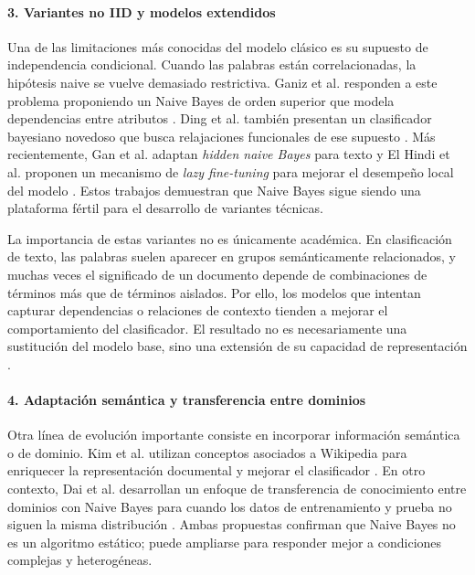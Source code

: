 \paragraph{3. Variantes no IID y modelos extendidos}

Una de las limitaciones más conocidas del modelo clásico es su supuesto de independencia condicional. Cuando las palabras están correlacionadas, la hipótesis naive se vuelve demasiado restrictiva. Ganiz et al. responden a este problema proponiendo un Naive Bayes de orden superior que modela dependencias entre atributos \cite{Ganiz20111022}. Ding et al. también presentan un clasificador bayesiano novedoso que busca relajaciones funcionales de ese supuesto \cite{4554061}. Más recientemente, Gan et al. adaptan \textit{hidden naive Bayes} para texto y El Hindi et al. proponen un mecanismo de \textit{lazy fine-tuning} para mejorar el desempeño local del modelo \cite{Gan2021,ELHINDI2020106652}. Estos trabajos demuestran que Naive Bayes sigue siendo una plataforma fértil para el desarrollo de variantes técnicas.

La importancia de estas variantes no es únicamente académica. En clasificación de texto, las palabras suelen aparecer en grupos semánticamente relacionados, y muchas veces el significado de un documento depende de combinaciones de términos más que de términos aislados. Por ello, los modelos que intentan capturar dependencias o relaciones de contexto tienden a mejorar el comportamiento del clasificador. El resultado no es necesariamente una sustitución del modelo base, sino una extensión de su capacidad de representación \cite{Ganiz20111022,Gan2021,ELHINDI2020106652}.

\paragraph{4. Adaptación semántica y transferencia entre dominios}

Otra línea de evolución importante consiste en incorporar información semántica o de dominio. Kim et al. utilizan conceptos asociados a Wikipedia para enriquecer la representación documental y mejorar el clasificador \cite{KIM2018128}. En otro contexto, Dai et al. desarrollan un enfoque de transferencia de conocimiento entre dominios con Naive Bayes para cuando los datos de entrenamiento y prueba no siguen la misma distribución \cite{10.5555/1619645.1619732}. Ambas propuestas confirman que Naive Bayes no es un algoritmo estático; puede ampliarse para responder mejor a condiciones complejas y heterogéneas.

